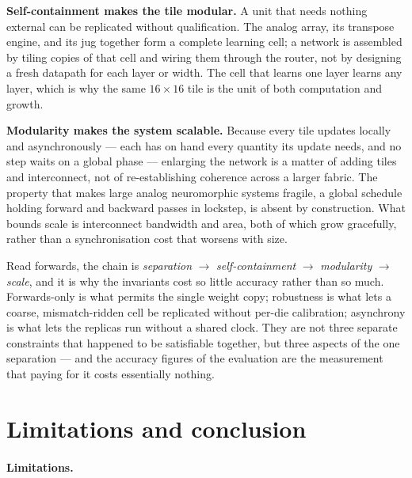 \documentclass[11pt]{article}
\begin{document}
\textbf{Self-containment makes the tile modular.} A unit that needs
nothing external can be replicated without qualification. The analog
array, its transpose engine, and its jug together form a complete
learning cell; a network is assembled by tiling copies of that cell and
wiring them through the router, not by designing a fresh datapath for
each layer or width. The cell that learns one layer learns any layer,
which is why the same \(16\times16\) tile is the unit of both
computation and growth.

\textbf{Modularity makes the system scalable.} Because every tile
updates locally and asynchronously --- each has on hand every quantity
its update needs, and no step waits on a global phase --- enlarging the
network is a matter of adding tiles and interconnect, not of
re-establishing coherence across a larger fabric. The property that
makes large analog neuromorphic systems fragile, a global schedule
holding forward and backward passes in lockstep, is absent by
construction. What bounds scale is interconnect bandwidth and area, both
of which grow gracefully, rather than a synchronisation cost that
worsens with size.

Read forwards, the chain is \emph{separation} \(\to\)
\emph{self-containment} \(\to\) \emph{modularity} \(\to\) \emph{scale},
and it is why the invariants cost so little accuracy rather than so
much. Forwards-only is what permits the single weight copy; robustness
is what lets a coarse, mismatch-ridden cell be replicated without
per-die calibration; asynchrony is what lets the replicas run without a
shared clock. They are not three separate constraints that happened to
be satisfiable together, but three aspects of the one separation --- and
the accuracy figures of the evaluation are the measurement that paying
for it costs essentially nothing.

\hypertarget{sec:conclusion}{%
\section{Limitations and conclusion}\label{sec:conclusion}}

\hypertarget{limitations.}{%
\paragraph{Limitations.}\label{limitations.}}
\end{document}

